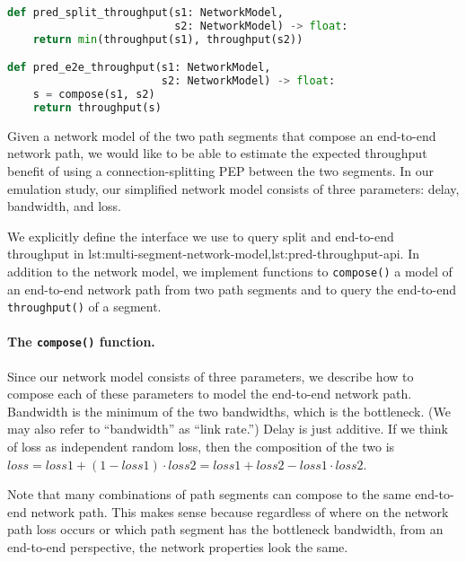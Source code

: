 \begin{lstfloat}[t]
\begin{lstlisting}[language=Python]
def pred_split_throughput(s1: NetworkModel,
                          s2: NetworkModel) -> float:
    return min(throughput(s1), throughput(s2))

def pred_e2e_throughput(s1: NetworkModel,
                        s2: NetworkModel) -> float:
    s = compose(s1, s2)
    return throughput(s)
\end{lstlisting}
\label{lst:pred-throughput-api}
\end{lstfloat}

Given a network model of the two path segments that compose an end-to-end
network path, we would like to be able to estimate the expected throughput
benefit of using a connection-splitting PEP between the two segments. In our
emulation study, our simplified network model consists of three
parameters: delay, bandwidth, and loss.

We explicitly define the interface we
use to query split and end-to-end throughput in \Cref
{lst:multi-segment-network-model,lst:pred-throughput-api}. In addition
to the network model, we implement functions to \texttt{compose()} a model of
an end-to-end network path from two path segments and to
query the end-to-end \texttt{throughput()} of a segment.

\paragraph{The \texttt{compose()} function.}
Since our network model consists of three parameters, we describe how to compose
each of these parameters to model the end-to-end network path. Bandwidth is the
minimum of the two bandwidths, which is the bottleneck.
(We may also refer to ``bandwidth'' as ``link rate.'')
Delay is just additive.
If we think of loss as independent random loss, then the composition
of the two is $loss = loss1 + (1-loss1)\cdot loss2 = loss1 + loss2 -
loss1 \cdot loss2$.

Note that many combinations of path segments can compose to the same end-to-end
network path. This makes sense because regardless of where on the network path
loss occurs or which path segment has the bottleneck bandwidth, from an
end-to-end perspective, the network properties look the same.

